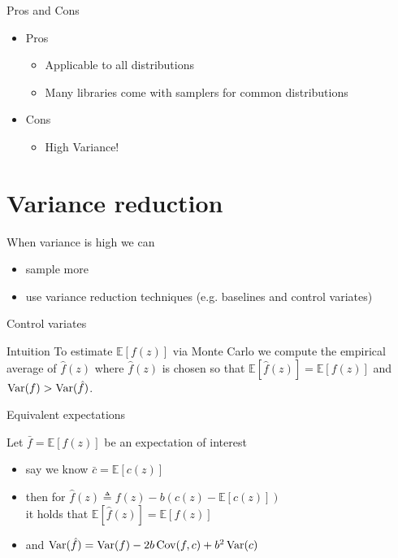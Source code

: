 \begin{frame}{Pros and Cons}
\begin{itemize}
\item Pros
\begin{itemize}
\item Applicable to all distributions
\item Many libraries come with samplers for common distributions
\end{itemize}
\pause
\item Cons
\begin{itemize}
\item High Variance!
\end{itemize}
\end{itemize}
\end{frame}

\section{Variance reduction}
\frame{\tableofcontents[currentsection]}

\begin{frame}{When variance is high we can}

\pause

\begin{itemize}
	\item sample more \\ \pause
	\item use variance reduction techniques (e.g. baselines and control variates)\\ 
\end{itemize}
\end{frame}

\begin{frame}{Control variates}

\begin{alertblock}{Intuition}
To estimate $\mathbb E[f(z)]$ via Monte Carlo we compute the empirical average of $\hat f(z)$ where $\hat f(z)$ is chosen so that $\mathbb E[\hat f(z)] = \mathbb E[f(z)]$ and $\operatorname{Var}(f) > \operatorname{Var}(\hat f)$.
\end{alertblock}

\end{frame}



\begin{frame}{Equivalent expectations}

Let $\bar f = \mathbb E[f(z)]$ be an expectation of interest \pause
\begin{itemize}
	\item say we know $\bar c = \mathbb E[c(z)]$ \pause
	\item then for $\hat f(z) \triangleq f(z) - b(c(z) - \mathbb E[c(z)])$ \\ \pause
	it holds that $\mathbb E[\hat f(z)] = \mathbb E[f(z)]$ \pause
	\item and $\operatorname{Var}(\hat f) = \operatorname{Var}(f) - 2b \operatorname{Cov}(f, c) + b^2 \operatorname{Var}(c)$ 
\end{itemize}

\end{frame}

